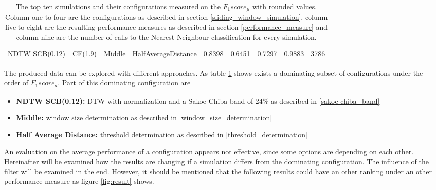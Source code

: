 \begin{table}[H]
\begin{center}
{\begin{tabular}{l l l l l l l l l}
                NDTW SCB(0.12) & CF(1.9) & Middle & HalfAverageDistance & 0.8398 & 0.6451 & 0.7297 & 0.9883 & 3786
            \end{tabular}
        }
    \end{center}
    \caption{The top ten simulations and their configurations measured on the $F_{1}score_{\mu}$ with rounded values.
    Column one to four are the configurations as described in section \ref{sliding_window_simulation}, column five to
    eight are the resulting performance measures as described in section \ref{performance_measure} and column nine are
    the number of calls to the Nearest Neighbour classification for every simulation.}
	\label{tab:result}
\end{table}

The produced data can be explored with different approaches. As table \ref{tab:result} shows exists a dominating subset
of configurations under the order of $F_{1}score_{\mu}$. Part of this dominating configuration are
\begin{itemize}
    \item \textbf{NDTW SCB(0.12):} DTW with normalization and a Sakoe-Chiba band of 24\% as described in
    \ref{sakoe-chiba_band}
    \item \textbf{Middle:} window size determination as described in \ref{window_size_determination}
    \item \textbf{Half Average Distance:} threshold determination as described in \ref{threshold_determination}
\end{itemize}
An evaluation on the average performance of a configuration appears not effective, since some options are depending on
each other. Hereinafter will be examined how the results are changing if a simulation differs from the dominating
configuration. The influence of the filter will be examined in the end. However, it should be mentioned that the
following results could have an other ranking under an other performance measure as figure \ref{fig:result} shows.

